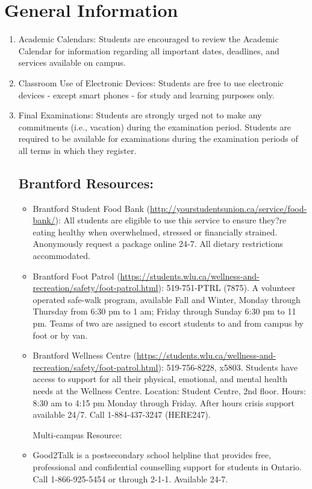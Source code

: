 \documentclass{article}
\begin{document}
\section*{General Information}
\begin{enumerate}


\item Academic Calendars: Students are encouraged to review the Academic Calendar for information regarding all important dates, deadlines, and services available on campus.

\item Classroom Use of Electronic Devices: Students are free to use electronic devices - except smart phones - for study and learning purposes only. 

\item Final Examinations: Students are strongly urged not to make any commitments (i.e., vacation) during the examination period. Students are required to be available for examinations during the examination periods of all terms in which they register. 

\subsection*{Brantford Resources:}

\begin{itemize}


\item Brantford Student Food Bank (\url{http://yourstudentsunion.ca/service/food-bank/}): All students are eligible to use this service to ensure they?re eating healthy when overwhelmed, stressed or financially strained. Anonymously request a package online 24-7. All dietary restrictions accommodated.

\item Brantford Foot Patrol (\url{https://students.wlu.ca/wellness-and-recreation/safety/foot-patrol.html}): 519-751-PTRL (7875). A volunteer operated safe-walk program, available Fall and Winter, Monday through Thursday from 6:30 pm to 1 am; Friday through Sunday 6:30 pm to 11 pm. Teams of two are assigned to escort students to and from campus by foot or by van.

\item Brantford Wellness Centre (\url{https://students.wlu.ca/wellness-and-recreation/safety/foot-patrol.html}): 519-756-8228, x5803. Students have access to support for all their physical, emotional, and mental health needs at the Wellness Centre. Location: Student Centre, 2nd floor. Hours: 8:30 am to 4:15 pm Monday through Friday. After hours crisis support available 24/7. Call 1-884-437-3247 (HERE247). 

Multi-campus Resource:
\item 
Good2Talk is a postsecondary school helpline that provides free, professional and confidential counselling support for students in Ontario. Call 1-866-925-5454 or through 2-1-1. Available 24-7.
\end{itemize}
\end{enumerate}
\end{document}

